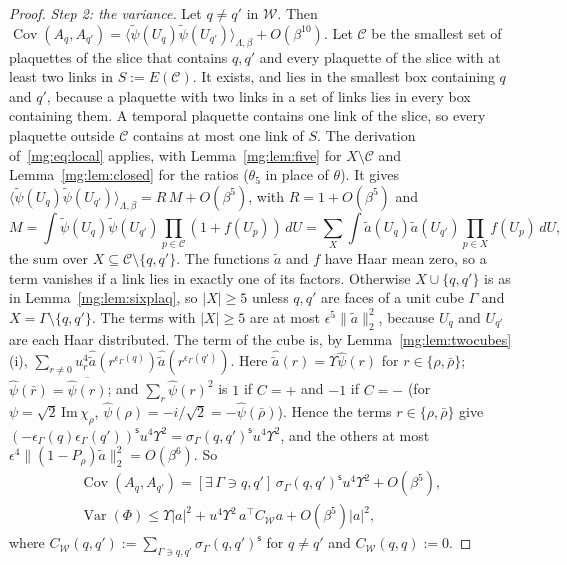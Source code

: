 \documentclass[11pt,a4paper]{article}
\theoremstyle{definition}
\theoremstyle{remark}
\DeclareMathOperator{\Cov}{Cov}
\DeclareMathOperator{\Var}{Var}
\newcommand{\dU}{\,dU}
\newcommand{\norm}[1]{\lVert #1\rVert}
\begin{document}
\begin{proof}
\emph{Step 2: the variance.} Let $q\ne q'$ in $\mathcal W$. Then $\Cov(A_q,A_{q'})=\langle\tilde\psi(U_q)\tilde\psi(U_{q'})\rangle_{\Lambda,\beta}+O(\beta^{10})$. Let $\mathcal C$ be the
smallest set of plaquettes of the slice that contains $q,q'$ and every plaquette of the slice with at least two links in $S:=E(\mathcal C)$. It exists, and
lies in the smallest box containing $q$ and $q'$, because a plaquette with two links in a set of links lies in every box containing them. A temporal plaquette
contains one link of the slice, so every plaquette outside $\mathcal C$ contains at most one link of $S$. The derivation of~\eqref{mg:eq:local}
applies, with Lemma~\ref{mg:lem:five} for $X\setminus\mathcal C$ and Lemma~\ref{mg:lem:closed} for the ratios ($\theta_5$ in place of
$\theta$). It gives $\langle\tilde\psi(U_q)\tilde\psi(U_{q'})\rangle_{\Lambda,\beta}=R\,M+O(\beta^5)$, with $R=1+O(\beta^5)$ and
\[
M=\int\tilde\psi(U_q)\tilde\psi(U_{q'})\prod_{p\in\mathcal C}(1+f(U_p))\dU=\sum_X\int\tilde a(U_q)\tilde a(U_{q'})\prod_{p\in X}f(U_p)\dU ,
\]
the sum over $X\subseteq\mathcal C\setminus\{q,q'\}$. The functions $\tilde a$ and $f$ have Haar mean zero, so a term vanishes if a link lies in exactly one of
its factors. Otherwise $X\cup\{q,q'\}$ is as in Lemma~\ref{mg:lem:sixplaq}, so $|X|\ge5$ unless $q,q'$ are faces of a unit cube $\Gamma$ and
$X=\Gamma\setminus\{q,q'\}$. The terms with $|X|\ge5$ are at most $\epsilon^5\norm{\tilde a}_2^2$, because $U_q$ and $U_{q'}$ are each Haar distributed. The
term of the cube is, by Lemma~\ref{mg:lem:twocubes}(i), $\sum_{r\ne0}u_r^4\hat{\tilde a}(r^{\epsilon_\Gamma(q)})\hat{\tilde a}(r^{\epsilon_\Gamma(q')})$. Here
$\hat{\tilde a}(r)=\Upsilon\hat\psi(r)$ for $r\in\{\rho,\bar\rho\}$; $\hat\psi(\bar r)=\overline{\hat\psi(r)}$; and $\sum_r\hat\psi(r)^2$ is $1$ if $C=+$ and $-1$ if
$C=-$ (for $\psi=\sqrt2\,\mathrm{Im}\,\chi_\rho$, $\hat\psi(\rho)=-i/\sqrt2=-\hat\psi(\bar\rho)$). Hence the terms $r\in\{\rho,\bar\rho\}$ give
$(-\epsilon_\Gamma(q)\epsilon_\Gamma(q'))^{\mathsf s}u^4\Upsilon^2=\sigma_\Gamma(q,q')^{\mathsf s}u^4\Upsilon^2$, and the others at most
$\epsilon^4\norm{(1-P_\rho)\tilde a}_2^2=O(\beta^6)$. So
\begin{gather*}
\Cov(A_q,A_{q'})=[\exists\,\Gamma\ni q,q']\,\sigma_\Gamma(q,q')^{\mathsf s}u^4\Upsilon^2+O(\beta^5),\\
\Var(\Phi)\le\Upsilon|a|^2+u^4\Upsilon^2\,a^\top C_{\mathcal W}a+O(\beta^5)|a|^2,
\end{gather*}
where $C_{\mathcal W}(q,q'):=\sum_{\Gamma\ni q,q'}\sigma_\Gamma(q,q')^{\mathsf s}$ for $q\ne q'$ and $C_{\mathcal W}(q,q):=0$.


\end{proof}
\end{document}
